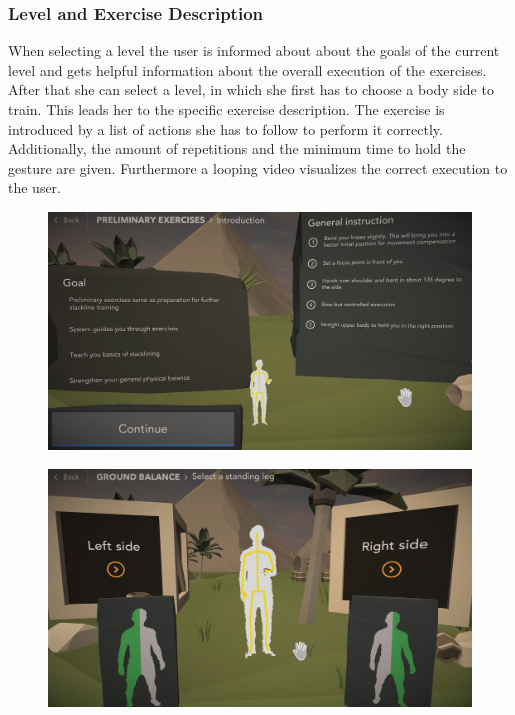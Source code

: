 \subsubsection{Level and Exercise Description}
When selecting a level the user is informed about about the goals of the current level and gets helpful information about the overall execution of the exercises. After that she can select a level, in which she first has to choose a body side to train. This leads her to the specific exercise description. The exercise is introduced by a list of actions she has to follow to perform it correctly. Additionally, the amount of repetitions and the minimum time to hold the gesture are given. Furthermore a looping video visualizes the correct execution to the user.
\begin{figure}[htb]
	\centering
	\begin{minipage}[t]{0.32\linewidth}
		\centering
		\includegraphics[width=1\linewidth]{Pictures/5_Workflow/8_LevelDescription}
		\label{fig:trickline}
	\end{minipage}
	\hfill
	\begin{minipage}[t]{0.32\linewidth}
		\centering
		\includegraphics[width=1\linewidth]{Pictures/5_Workflow/9_1_SideSelectionNone}

\end{minipage}
\end{figure}
